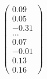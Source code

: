 \documentclass[preview]{standalone}
\begin{document}
\begin{align*}
\begin{pmatrix} 0.09 \\ 0.05 \\ -0.31 \\ \dots \\ 0.07 \\ -0.01 \\ 0.13 \\ 0.16 \end{pmatrix}
\end{align*}
\end{document}
